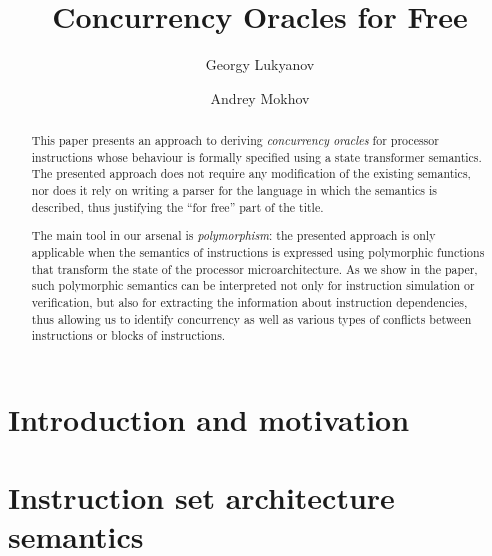 \documentclass[runningheads]{llncs}
\begin{document}
%
\title{Concurrency Oracles for Free}

%
\author{Georgy Lukyanov \and Andrey Mokhov}
%
%

\maketitle

\begin{abstract}
This paper presents an approach to deriving \emph{concurrency oracles} for
processor instructions whose behaviour is formally specified using a state
transformer semantics. The presented approach does not require any modification
of the existing semantics, nor does it rely on writing a parser for the language
in which the semantics is described, thus justifying the ``for free'' part of
the title.

The main tool in our arsenal is \emph{polymorphism}: the presented approach is
only applicable when the semantics of instructions is expressed using polymorphic
functions that transform the state of the processor microarchitecture. As we
show in the paper, such polymorphic semantics can be interpreted not only for
instruction simulation or verification, but also for extracting the information
about instruction dependencies, thus allowing us to identify concurrency as well
as various types of conflicts between instructions or blocks of instructions.

\end{abstract}

\section{Introduction and motivation\label{sec:intro}}


\vspace{-1mm}
\section{Instruction set architecture semantics\label{sec:instructions}}
\vspace{-1mm}

\end{document}
